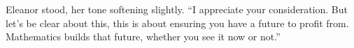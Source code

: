 \smallskip

Eleanor stood, her tone softening slightly. “I appreciate your consideration. But let’s be clear about this, this is about ensuring you have a future to profit from. Mathematics builds that future, whether you see it now or not.”


% 
% 
% 
% 
% 
% 
